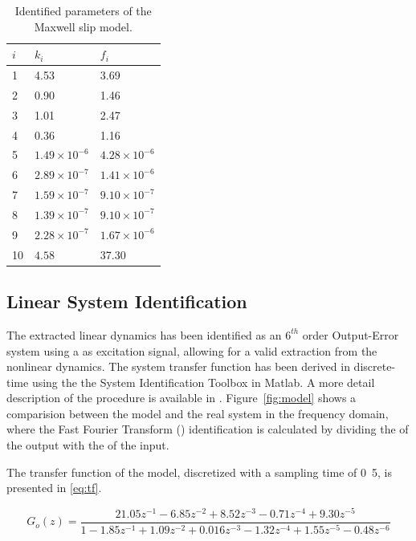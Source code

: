\begin{table}[h!]
  \centering
  \begin{tabular}{| l | l | l |}
    \hline
    $i$ & $k_i$ & $f_i$ \\ \hline
    1 & 4.53 & 3.69 \\
    2 & 0.90 & 1.46 \\
    3 & 1.01 & 2.47 \\
    4 & 0.36 & 1.16 \\
    5 & $1.49 \times 10^{-6}$ & $4.28 \times 10^{-6}$ \\
    6 & $2.89 \times 10^{-7}$ & $1.41 \times 10^{-6}$ \\
    7 & $1.59 \times 10^{-7}$ & $9.10 \times 10^{-7}$ \\
    8 & $1.39 \times 10^{-7}$ & $9.10 \times 10^{-7}$ \\
    9 & $2.28 \times 10^{-7}$ & $1.67 \times 10^{-6}$ \\
    10 & $4.58$ & 37.30 \\
    \hline
  \end{tabular}
  \caption{\label{tab:maxwell} Identified parameters of the Maxwell slip model.}
\end{table}

\subsection{Linear System Identification}
\label{sec:linsys}
The extracted linear dynamics has been identified as an $6^{th}$ order Output-Error system using a \abbrPRBS as excitation signal, allowing for a valid extraction from the nonlinear dynamics. The system transfer function has been derived in discrete-time using the the System Identification Toolbox in Matlab. A more detail description of the procedure is available in \citep{ButcherController:2015}. Figure~\ref{fig:model} shows a comparision between the model and the real system in the frequency domain, where the Fast Fourier Transform (\abbrFFT) identification is calculated by dividing the \abbrFFT of the output with the \abbrFFT of the input.

 The transfer function of the model, discretized with a sampling time of \unit{0.5}{\milli\second}, is presented in \eqref{eq:tf}.

\begin{equation}
  \label{eq:tf}
  G_o(z) = \frac{21.05z^{-1} - 6.85z^{-2} + 8.52z^{-3} - 0.71z^{-4} + 9.30z^{-5}}{1 - 1.85z^{-1} + 1.09z^{-2} + 0.016z^{-3} - 1.32z^{-4} + 1.55z^{-5} - 0.48z^{-6}}
\end{equation}

